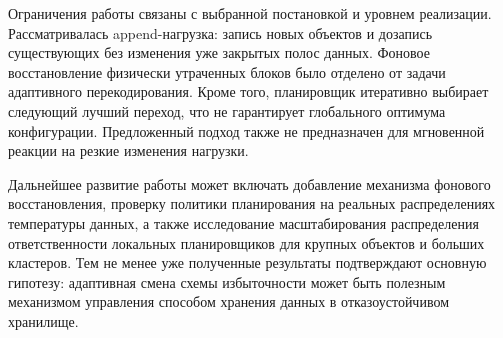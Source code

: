 Ограничения работы связаны с выбранной постановкой и уровнем реализации.
Рассматривалась append-нагрузка: запись новых объектов и дозапись существующих
без изменения уже закрытых полос данных. Фоновое восстановление физически
утраченных блоков было отделено от задачи адаптивного перекодирования. Кроме
того, планировщик итеративно выбирает следующий лучший переход, что не
гарантирует глобального оптимума конфигурации. Предложенный подход также не
предназначен для мгновенной реакции на резкие изменения нагрузки.

Дальнейшее развитие работы может включать добавление механизма фонового
восстановления, проверку политики планирования на реальных распределениях
температуры данных, а также исследование масштабирования распределения
ответственности локальных планировщиков для крупных объектов и больших
кластеров. Тем не менее уже полученные результаты подтверждают основную
гипотезу: адаптивная смена схемы избыточности может быть полезным механизмом
управления способом хранения данных в отказоустойчивом хранилище.

\pagebreak
